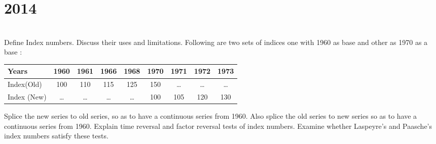 \section*{2014}
\vspace{-.5cm}
\hrulefill \smallskip\\
 Define Index numbers. Discuss their uses and limitations.
\myline
{} Following are two sets of indices one with 1960 as base and other as 1970 as a base :
\begin{center}
    \begin{tabular}{| l | *{7}{c|} c|}
    \hline
    Years & 1960 & 1961 & 1966 & 1968 & 1970 & 1971 &1972 & 1973 \\ \hline
    Index(Old)  & 100 & 110 & 115 & 125 & 150 & \ldots & \ldots & \ldots\\ \hline 
    Index (New) & \ldots    & \ldots & \ldots & \ldots & 100 & 105 & 120 & 130\\ \hline
    \end{tabular}
\end{center}
Splice the new series to old series, so as to have a continuous series from 1960. Also splice the old series to new series so as to have a continuous series from 1960.
\myline
{} Explain time reversal and factor reversal tests of index numbers. Examine whether Laspeyre's and Paasche's index numbers satisfy these tests.
